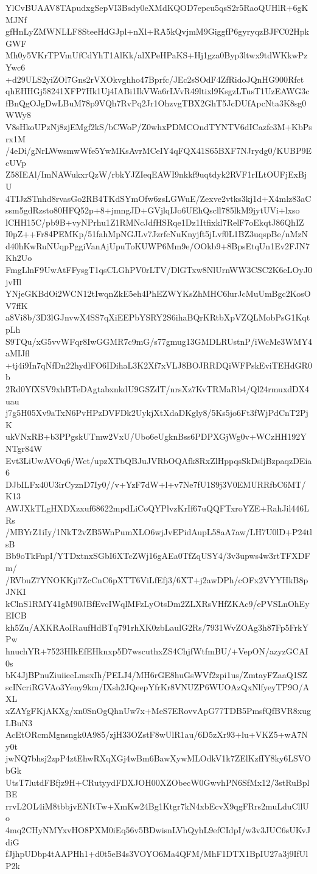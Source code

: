 YlCvBUAAV8TApudxgSepVI3Bsdy0eXMdKQOD7epcu5qsS2r5RaoQUHlR+6gKMJNf
gfHnLyZMWNLLF8SteeHdGJpl+nXl+RA5kQvjmM9GiggfP6gyryqzBJFC02HpkGWF
Mh0y5VKrTPVmUfCdYhT1AlKk/alXPeHPaKS+Hj1gza0Byp3ltwx9tdWKkwPzYwc6
+d29ULS2yiZOl7Gns2rVXOkvghho47Bprfc/JEc2sSOdF4ZfRidoJQnHG900Rfct
qhEHHGj58241XFP7Hk1Uj4IABi1IkVWa6rLVvR49ltixl9KsgzLTusT1UzEAWG3c
fBnQgOJgDwLBuM78p9VQh7RvPq2Jr1OhzvgTBX2GhT5JcDUfApcNta3K8sg0WWy8
V8sHkoUPzNj8zjEMgf2kS/bCWoP/Z0whxPDMCOndTYNTV6dICazfc3M+KbPsrx1M
/4eDi/gNrLWwsmwWfe5YwMKsAvrMCeIY4qFQX41S65BXF7NJrydg0/KUBP9EcUVp
Z58IEAl/ImNAWukxrQzW/rbkYJZIeqEAWI9nkkf9uqtdyk2RVF1rILtOUFjExBjU
4TIJzSTnhd8rvasGo2RB4TKdSYmOfw6zsLGWuE/Zexve2vtks3kj1d+X4mlz83aC
ssm5gdRzsto80HFQ52p+8+jmngJD+GVjlqIJo6UEhQscll785lkM9jytUVi+lxso
lCHH15C/pb9B+vyNPrhu1Z1RMNcJdfHSRqe1Dz1Itfixkl7RelF7oEkqtJ86QhIZ
I0pZ++Fr84PEMKp/51fahMpNGJLv7JzrfcNuKnyjft5jLvf0L1BZ3uqspBe/nMzN
d40hKwRuNUqpPggiVanAjUpuToKUWP6Mm9e/OOkb9+8BpsEtqUn1Ev2FJN7Kh2Uo
FmgLlnF9UwAtFFysgT1qsCLGhPV0rLTV/DlGTxw8NlUrnWW3CSC2K6eLOyJ0jvHl
YNjeGKBdOi2WCN12tIwqnZkE5eh4PhEZWYKsZhMHC6lurJcMuUmBgc2KosOV7ffK
a8Vi8b/3D3lGJnvwX4SS7qXiEEPbYSRY2S6ihaBQrKRtbXpVZQLMobPsG1KqtpLh
S9TQu/xG5vvWFqr8IwGGMR7c9mG/s77gmug13GMDLRUstnP/iWcMe3WMY4aMIJfl
+tj4i9In7qNfDn22hydlFO6IDihaL3K2Xf7xVLJ8BOJRRDQiWFPskEviTEHdGR0b
2Rd0YfXSV9xhBTeDAgtabxnkdU9GSZdT/nrsXz7KvTRMaRb4/Ql24rmuxdDX4uau
j7g5H05Xv9aTxN6PvHPzDVFDk2UykjXtXdaDKgly8/5Ks5jo6Ft3fWjPdCnT2PjK
ukVNxRB+b3PPgskUTmw2VxU/Ubo6eUgknBss6PDPXGjWg0v+WCzHH192YNTgr84W
Evt3LiUwAVOq6/Wct/upzXTbQBJuJVRbOQAfk8RxZlHppqsSkDsljBzpaqzDEia6
DJbILFx40U3irCyznD7Iy0//v+YzF7dW+l+v7Ne7fU1S9j3V0EMURRfbC6MT/K13
AWJXkTLgHXDXzxuf68622mpdLiCoQYPlvzKrIf67uQQFTxroYZE+RahJil446LRs
/MBYrZ1iIy/1NkT2vZB5WnPumXLO6wjJvEPidAupL58aA7aw/LH7U0lD+P24tlsB
Bb9oTkFnpI/YTDxtnxSGbI6XTcZWj16gAEa0TfZqUSY4/3v3upws4w3rtTFXDFm/
/RVbuZ7YNOKKji7ZcCnC6pXTT6ViLfEfj3/6XT+j2awDPh/cOFx2VYYHkB8pJNKI
kClnS1RMY41gM90JBfEvcIWqlMFzLyOtsDm2ZLXRsVHfZKAc9/ePVSLnOhEyEICB
kh5Zu/AXKRAoIRaufHdBTq791rhXK0zbLaulG2Rs/7931WvZOAg3h87Fp5FrkYPw
hnuchYR+7523HIkEfEHknxp5D7wscuthxZS4ChjfWtfmBU/+VepON/azyzGCAI0s
bK4JjBPnuZiuiieeLmsxIh/PELJ4/MH6rGE8huGsWVf2zpi1us/ZmtayFZaaQ1SZ
scINcriRGVAo3Yeny9km/IXsh2JQeepYfrKr8VNUZP6WUOAzQxNlfyeyTP9O/AXL
xZAYgFKjAKXg/xn0SnOgQhnUw7x+MeS7ERovvApG77TDB5PmsfQfBVR8xugLBuN3
AcEtORcmMgnsngk0A985/zjH33OZstF8wUlR1au/6D5zXr93+lu+VKZ5+wA7Ny0t
jwNQ7bhsj2zpP4ztEhwRXqXGj4wBm6BawXywMLOdkV1k7ZElKzfIY8ky6LSVObGk
UtsT7lutdFBfjz9H+CRutyydFDXJOH00XZObecW0GwvhPN6SfMx12/3stRuBplBE
rrvL2OL4iM8tbbjvENItTw+XmKw24Bg1Ktgr7kN4xbEcvX9qgFRrs2muLduCllUo
4mq2CHyNMYxvHO8PXM0iEq56v5BDwisnLVhQyhL9efCIdpI/w3v3JUC6sUKvJdiG
fJjhpUDbp4tAAPHh1+d0t5eB4s3VOYO6Ma4QFM/MhF1DTX1BpIU27a3j9IfUlP2k
